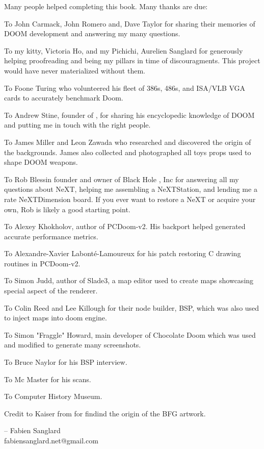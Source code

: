 Many people helped completing this book. Many thanks are due:\\
\par
To John Carmack, John Romero and, Dave Taylor for sharing their memories of DOOM development and answering my many questions.\\
\par
To my kitty, Victoria Ho, and my Pichichi, Aurelien Sanglard for generously helping proofreading and being my pillars in time of discouragments. This project would have never materialized without them.\\ 
\par
To Foone Turing who volunteered his fleet of 386s, 486s, and ISA/VLB VGA cards to accurately benchmark Doom.\\
\par
To Andrew Stine, founder of , for sharing his encyclopedic knowledge of DOOM and putting me in touch with the right people.\\
\par
To James Miller and Leon Zawada who researched and discovered the origin of the backgrounds. James also collected and photographed all toys props used to shape DOOM weapons.\\
\par
To Rob Blessin founder and owner of Black Hole , Inc for answering all my questions about NeXT, helping me assembling a NeXTStation, and lending me a rate NeXTDimension board. If you ever want to restore a NeXT or acquire your own, Rob is likely a good starting point.\\
\par
To Alexey Khokholov, author of PCDoom-v2. His backport helped generated accurate performance metrics.\\
\par
To Alexandre-Xavier Labont\'e-Lamoureux for his patch restoring C drawing routines in PCDoom-v2.\\
\par
To Simon Judd, author of Slade3, a map editor used to create maps showcasing special aspect of the renderer.\\
\par
To Colin Reed and Lee Killough for their node builder, BSP, which was also used to inject maps into doom engine.\\
\par
To Simon "Fraggle" Howard, main developer of Chocolate Doom which was used and modified to generate many screenshots.\\
\par
To Bruce Naylor for his BSP interview.\\
\par
To Mc Master for his scans.\\
\par
To Computer History Museum.\\
\par
Credit to Kaiser from  for findind the origin of the BFG artwork.\\
\par

-- Fabien Sanglard\\
fabiensanglard.net@gmail.com
